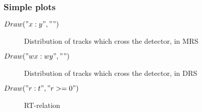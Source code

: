 \documentclass[a4paper,12pt]{article}
\begin{document}
\subsubsection{Simple plots}

\begin{description}
\item[$Draw("x:y","")$] Distribution of tracks which cross the detector, in MRS
\item[$Draw("wx:wy","")$] Distribution of tracks which cross the detector, in DRS
\item[$Draw("r:t","r>=0")$] RT-relation
\end{description}

\end{document}
